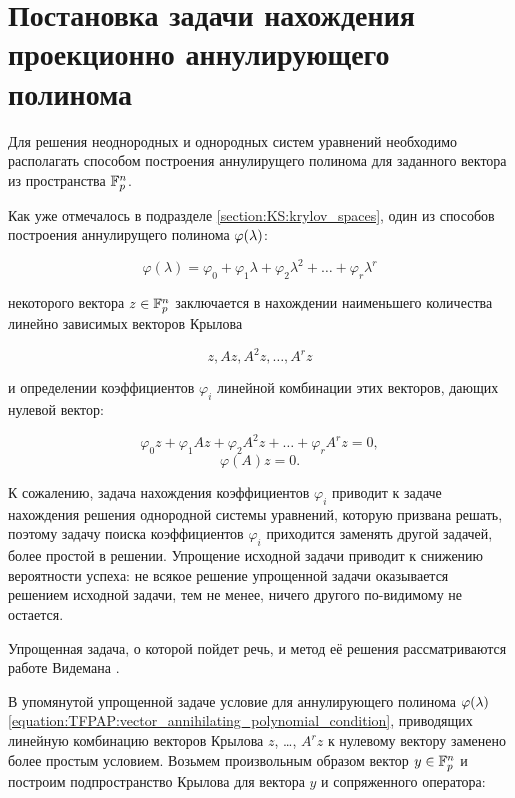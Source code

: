 \section{Постановка задачи нахождения проекционно аннулирующего полинома} \label{section:TFPAP:task_for_finding_projection_annihilating_polynomials}

Для решения неоднородных и однородных систем уравнений необходимо располагать способом построения аннулирущего полинома для заданного
вектора из пространства $\mathbb{F}^{n}_p$.

Как уже отмечалось в подразделе \ref{section:KS:krylov_spaces}, один из способов построения аннулирущего полинома $\varphi (\lambda)$:

	$$ \varphi(\lambda) =
		\varphi_0 + \varphi_1 \lambda + \varphi_2 \lambda^2 + \dots + \varphi_r \lambda^r $$

некоторого вектора $z \in \mathbb{F}^{n}_p$ заключается в нахождении наименьшего количества линейно зависимых векторов Крылова 

	$$ z, Az, A^2z, \dots, A^rz $$

и определении коэффициентов $\varphi_i$ линейной комбинации этих векторов, дающих нулевой вектор:

	$$ \varphi_0 z + \varphi_1 Az + \varphi_2 A^2 z + \dots + \varphi_r A^r z = 0, $$
	\begin{equation} \label{equation:TFPAP:vector_annihilating_polynomial_condition}
		\varphi(A) z = 0.
	\end{equation}

К сожалению, задача нахождения коэффициентов $\varphi_i$ приводит к задаче нахождения решения однородной системы уравнений, которую
призвана решать, поэтому задачу поиска коэффициентов $\varphi_i$ приходится заменять другой задачей, более простой в решении.
Упрощение исходной задачи приводит к снижению вероятности успеха: не всякое решение упрощенной задачи оказывается решением исходной
задачи, тем не менее, ничего другого по-видимому не остается.

Упрощенная задача, о которой пойдет речь, и метод её решения рассматриваются работе Видемана \cite{Wiedemann}.

В упомянутой упрощенной задаче условие для аннулирующего полинома $\varphi (\lambda)$
\eqref{equation:TFPAP:vector_annihilating_polynomial_condition}, приводящих линейную комбинацию векторов Крылова $z$, \dots, $A^rz$
к нулевому вектору заменено более простым условием. Возьмем произвольным образом вектор $y \in \mathbb{F}^{n}_p$ и построим подпространство
Крылова для вектора $y$ и сопряженного оператора:

